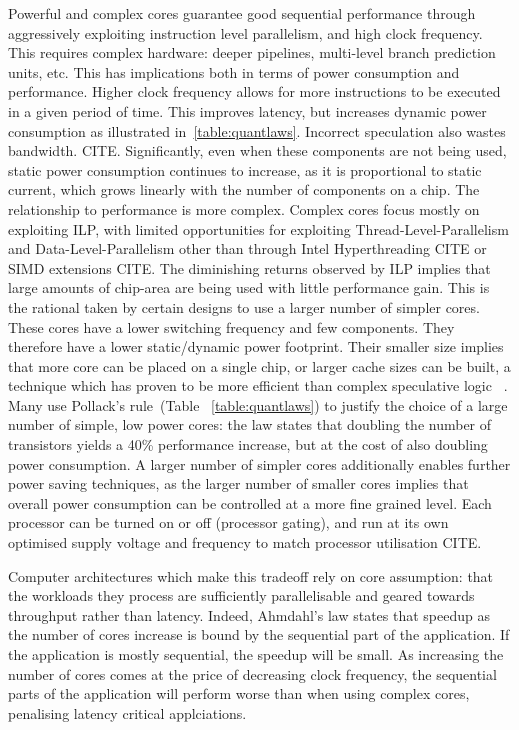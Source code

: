 Powerful and complex cores guarantee good sequential performance
through aggressively exploiting instruction level parallelism,
and high clock frequency. This requires complex hardware:
deeper pipelines, multi-level branch prediction units, etc.
This has implications both in terms of power consumption
and performance. Higher clock frequency allows for more 
instructions to be executed in a given period of time. This
improves latency, but increases dynamic power consumption as illustrated
in~\ref{table:quantlaws}. Incorrect speculation also wastes bandwidth. CITE. 
Significantly, even when these components are not being used, 
static power consumption continues to increase, as it is proportional
to static current, which grows linearly with the number of components
on a chip. The relationship to performance is more complex. Complex cores
focus mostly on exploiting ILP, with limited opportunities
for exploiting Thread-Level-Parallelism and Data-Level-Parallelism
other than through Intel Hyperthreading CITE or SIMD extensions CITE. 
The diminishing returns observed by ILP implies that large amounts
of chip-area are being used with little performance gain. This is 
the rational taken by certain designs to use a larger number
of simpler cores. These cores have a lower switching frequency
and few components. They therefore have a lower static/dynamic power
footprint. Their smaller size implies that more core can be placed on 
a single chip, or larger cache sizes can be built, a technique
which has proven to be more efficient than complex speculative logic
~\cite{borkar2011future}.  Many use Pollack's rule~\cite{borkar2011future}(Table ~\ref{table:quantlaws})
to justify the choice of a large number of simple, low power cores: the 
law states that doubling the number of transistors yields
a 40\% performance increase, but at the cost of also doubling power consumption.
A larger number of simpler cores additionally enables further power saving techniques, as the larger number of smaller cores implies that overall power consumption can be controlled at a more fine grained level. 
Each processor can be turned on or off (processor gating), and run at its own
optimised supply voltage and frequency to match processor utilisation CITE. 

Computer architectures which make this tradeoff rely on core assumption: that the workloads they process
are sufficiently parallelisable and geared towards throughput rather than latency.
Indeed, Ahmdahl's law states that speedup as the number of cores increase
is bound by the sequential part of the application. If the application 
is mostly sequential, the speedup will be small. As increasing the number of 
cores comes at the price of decreasing clock frequency, the sequential
parts of the application will perform worse than when using complex cores, penalising latency
critical applciations. 

